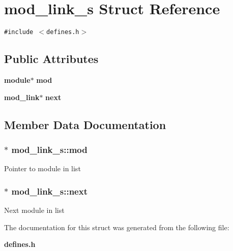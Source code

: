 \section{mod\_\-link\_\-s  Struct Reference}
\label{structmod__link__s}
{\tt \#include $<$defines.h$>$}

\subsection*{Public Attributes}
\begin{CompactItemize}
\item 
{\bf module}$\ast$ {\bf mod}
\item 
{\bf mod\_\-link}$\ast$ {\bf next}
\end{CompactItemize}


\subsection{Member Data Documentation}
\subsubsection{ $\ast$ mod\_\-link\_\-s::mod}\label{structmod__link__s_m0}


Pointer to module in list 
\subsubsection{ $\ast$ mod\_\-link\_\-s::next}\label{structmod__link__s_m1}


Next module in list 

The documentation for this struct was generated from the following file:\begin{CompactItemize}
\item 
{\bf defines.h}\end{CompactItemize}
